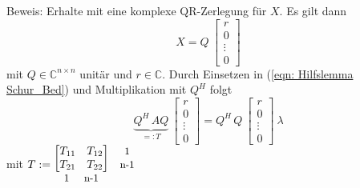 \documentclass[a4paper,12pt]{report}
\newcommand{\C}{\mathbb C}
\newcommand{\1}{\mathds{1}}
\theoremstyle{plain} %
\theoremstyle{definition} %
\theoremstyle{remark}
\begin{document}
            Beweis:
            Erhalte mit \cite[S. 233]{matrixGolub} eine komplexe QR-Zerlegung für $X$. Es gilt dann
            $$X = Q\ \begin{bmatrix}
                  r\\
                  0\\
                  \vdots\\
                  0
            \end{bmatrix}$$
            mit $Q\in \C^{n \times n}$ unitär und $r\in \C$.
            Durch Einsetzen in (\ref{eqn: Hilfslemma Schur_Bed}) und Multiplikation mit $Q^H$ folgt
            \begin{equation}
                  \label{eqn: Hilfslemma_Schur_Gl}
                  \underbrace{Q^H\,AQ}_{=:T}\ \begin{bmatrix}
                        r\\
                        0\\
                        \vdots\\
                        0
                  \end{bmatrix} = Q^H\,Q\ \begin{bmatrix}
                        r\\
                        0\\
                        \vdots\\
                        0
                  \end{bmatrix}\ \lambda
            \end{equation}
            mit $T:=\begin{matrix}
                  \begin{bmatrix}
                        T_{11} & T_{12}\\
                        T_{21} & T_{22}\\
                  \end{bmatrix} & \begin{matrix}
                  \text{\small 1} \\\text{\small{n-1}}
                  \end{matrix} \\
                  \begin{matrix}
                  \text{\small 1} &  \text{  \small{n-1}}\\
                  \end{matrix} &  \\
                  \end{matrix}$\\
\end{document}

